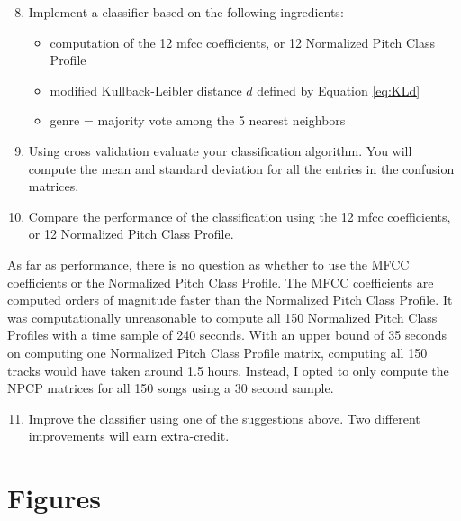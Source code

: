 \documentclass{article} %
\begin{document}
\begin{framed}
\begin{enumerate}
\setcounter{enumi}{7}
\item Implement a classifier based on the following ingredients:
\begin{itemize}
\item computation of the 12 mfcc coefficients, or 12 Normalized Pitch Class Profile
\item modified Kullback-Leibler distance $d$ defined by Equation \ref{eq:KLd}
\item genre = majority vote among the 5 nearest neighbors
\end{itemize}
\item Using cross validation evaluate your classification algorithm. You will compute the mean and standard deviation for all the entries in the confusion matrices. 
\item Compare the performance of the classification using the 12 mfcc coefficients, or 12 Normalized Pitch Class Profile. 
\end{enumerate}
\end{framed}

As far as performance, there is no question as whether to use the MFCC coefficients or the Normalized Pitch Class Profile. The MFCC coefficients are computed orders of magnitude faster
than the Normalized Pitch Class Profile. It was computationally unreasonable to compute all 150 Normalized Pitch Class Profiles with a time sample of 240 seconds. With an upper bound of 
35 seconds on computing one Normalized Pitch Class Profile matrix, computing all 150 tracks would have taken around 1.5 hours. Instead, I opted to only compute the NPCP matrices
for all 150 songs using a 30 second sample. 


\begin{framed}
\begin{enumerate}
\setcounter{enumi}{10}
\item Improve the classifier using one of the suggestions above. Two different improvements will earn extra-credit.
\end{enumerate}
\end{framed}

\clearpage
\appendix
\section{Figures}
\end{document}
